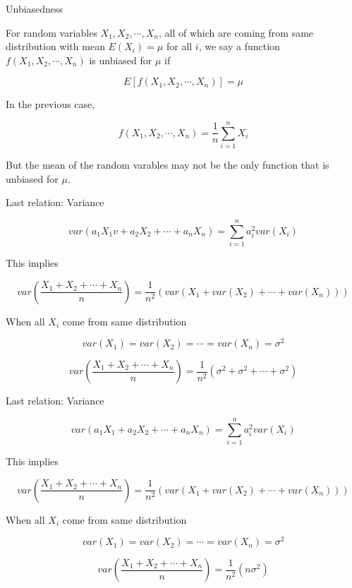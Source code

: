\documentclass{beamer}\usepackage[]{graphicx}\usepackage[]{color}
\begin{document}
\begin{frame}{Unbiasedness}

For random variables $X_1, X_2, \cdots, X_n$, all of which are coming from same distribution with mean $E(X_i)=\mu$ for all $i$,  we say a function $f(X_1, X_2, \cdots, X_n)$
is unbiased for $\mu$ if 

$$ E \left [f(X_1, X_2, \cdots, X_n) \right ] =  \mu$$

In the previous case, 

$$ f(X_1, X_2, \cdots, X_n) = \frac{1}{n} \sum_{i=1}^{n} X_{i}  $$

But the mean of the random varables may not be the only function that is unbiased for 
$\mu$. 

\end{frame}


\begin{frame}{Last relation: Variance}

$$ var(a_1X_1v+ a_2 X_2 + \cdots + a_nX_n) = \sum_{i=1}^{n} a^2_{i} var (X_{i}) $$ \pause

This implies 

$$ var \left (\frac{X_1 + X_2 + \cdots + X_{n}}{n} \right ) = \frac{1}{n^2} \left (var(X_1 + var(X_2) + \cdots + var(X_n)) \right ) $$ \pause

When all $X_i$ come from same distribution

$$ var(X_1) = var(X_2) = \cdots = var(X_n) = \sigma^2 $$ \pause 

$$ var \left (\frac{X_1 + X_2 + \cdots + X_{n}}{n} \right ) = \frac{1}{n^2} \left (\sigma^2 + \sigma^2 + \cdots + \sigma^2 \right) $$

\end{frame}

\begin{frame}{Last relation: Variance}

$$ var(a_1X_1+ a_2 X_2 + \cdots + a_nX_n) = \sum_{i=1}^{n} a^2_{i} var (X_{i}) $$

This implies 

$$ var \left (\frac{X_1 + X_2 + \cdots + X_{n}}{n} \right ) = \frac{1}{n^2} \left (var(X_1 + var(X_2) + \cdots + var(X_n)) \right ) $$

When all $X_i$ come from same distribution

$$ var(X_1) = var(X_2) = \cdots = var(X_n) = \sigma^2 $$

$$ var \left (\frac{X_1 + X_2 + \cdots + X_{n}}{n} \right ) = \frac{1}{n^2}(n \sigma^2) $$

\end{frame}
\end{document}
